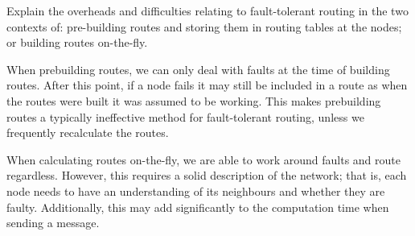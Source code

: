 \question Explain the overheads and difficulties relating to fault-tolerant routing in the two contexts of: pre-building routes and storing them in routing tables at the nodes; or building routes on-the-fly.
\begin{solution}
  When prebuilding routes, we can only deal with faults at the time of building routes. After this point, if a node fails it may still be included in a route as when the routes were built it was assumed to be working. This makes prebuilding routes a typically ineffective method for fault-tolerant routing, unless we frequently recalculate the routes.

  When calculating routes on-the-fly, we are able to work around faults and route regardless. However, this requires a solid description of the network; that is, each node needs to have an understanding of its neighbours and whether they are faulty. Additionally, this may add significantly to the computation time when sending a message. 
\end{solution}


